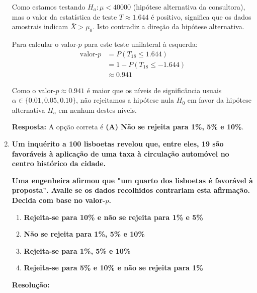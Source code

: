 \documentclass[a4paper,12pt]{article}
\begin{document}
\begin{enumerate}
\begin{mdframed}[backgroundcolor=gray!10, linewidth=0pt, innertopmargin=10pt, innerbottommargin=10pt]
    Como estamos testando $H_a: \mu < 40000$ (hipótese alternativa da consultora), mas o valor da estatística de teste $T \approx 1.644$ é positivo, significa que os dados amostrais indicam $\bar{X} > \mu_0$. Isto contradiz a direção da hipótese alternativa.

    Para calcular o valor-$p$ para este teste unilateral à esquerda:
    \begin{align*}
    \text{valor-}p &= P(T_{18} \leq 1.644) \\
    &= 1 - P(T_{18} \leq -1.644) \\
    &\approx 0.941
    \end{align*}

    Como o valor-$p \approx 0.941$ é maior que os níveis de significância usuais $\alpha \in \{0.01, 0.05, 0.10\}$, não rejeitamos a hipótese nula $H_0$ em favor da hipótese alternativa $H_a$ em nenhum destes níveis.

    \textbf{Resposta:} A opção correta é \textbf{(A) Não se rejeita para 1\%, 5\% e 10\%}.
    \end{mdframed}

    \vspace{0.5cm}

    \item \textbf{Um inquérito a 100 lisboetas revelou que, entre eles, 19 são favoráveis à aplicação de uma taxa à circulação automóvel no centro histórico da cidade.}

    \textbf{Uma engenheira afirmou que "um quarto dos lisboetas é favorável à proposta". Avalie se os dados recolhidos contrariam esta afirmação. Decida com base no valor-\(p\).}

    \vspace{0.3cm}

    \begin{enumerate}[label=\Alph*)]
        \item \textbf{Rejeita-se para 10\% e não se rejeita para 1\% e 5\%}
        \item \textbf{Não se rejeita para 1\%, 5\% e 10\%}
        \item \textbf{Rejeita-se para 1\%, 5\% e 10\%}
        \item \textbf{Rejeita-se para 5\% e 10\% e não se rejeita para 1\%}
    \end{enumerate}

    \vspace{0.3cm}

    \begin{mdframed}[backgroundcolor=gray!10,linewidth=0pt,innertopmargin=10pt,innerbottommargin=10pt]
    \textbf{Resolução:}


\end{mdframed}
\end{enumerate}
\end{document}
